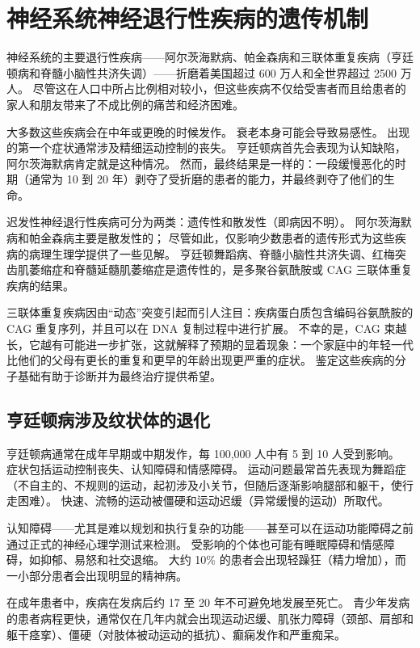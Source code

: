 \chapter{神经系统神经退行性疾病的遗传机制}

神经系统的主要退行性疾病——阿尔茨海默病、帕金森病和三联体重复疾病（亨廷顿病和脊髓小脑性共济失调）——折磨着美国超过 600 万人和全世界超过 2500 万人。 尽管这在人口中所占比例相对较小，但这些疾病不仅给受害者而且给患者的家人和朋友带来了不成比例的痛苦和经济困难。

大多数这些疾病会在中年或更晚的时候发作。 衰老本身可能会导致易感性。 出现的第一个症状通常涉及精细运动控制的丧失。 亨廷顿病首先会表现为认知缺陷，阿尔茨海默病肯定就是这种情况。 然而，最终结果是一样的：一段缓慢恶化的时期（通常为 10 到 20 年）剥夺了受折磨的患者的能力，并最终剥夺了他们的生命。

迟发性神经退行性疾病可分为两类：遗传性和散发性（即病因不明）。 阿尔茨海默病和帕金森病主要是散发性的； 尽管如此，仅影响少数患者的遗传形式为这些疾病的病理生理学提供了一些见解。 亨廷顿舞蹈病、脊髓小脑性共济失调、红梅突齿肌萎缩症和脊髓延髓肌萎缩症是遗传性的，是多聚谷氨酰胺或 CAG 三联体重复疾病的结果。

三联体重复疾病因由“动态”突变引起而引人注目：疾病蛋白质包含编码谷氨酰胺的 CAG 重复序列，并且可以在 DNA 复制过程中进行扩展。 不幸的是，CAG 束越长，它越有可能进一步扩张，这就解释了预期的显着现象：一个家庭中的年轻一代比他们的父母有更长的重复和更早的年龄出现更严重的症状。 鉴定这些疾病的分子基础有助于诊断并为最终治疗提供希望。

\section{亨廷顿病涉及纹状体的退化}
亨廷顿病通常在成年早期或中期发作，每 100,000 人中有 5 到 10 人受到影响。 症状包括运动控制丧失、认知障碍和情感障碍。 运动问题最常首先表现为舞蹈症（不自主的、不规则的运动，起初涉及小关节，但随后逐渐影响腿部和躯干，使行走困难）。 快速、流畅的运动被僵硬和运动迟缓（异常缓慢的运动）所取代。

认知障碍——尤其是难以规划和执行复杂的功能——甚至可以在运动功能障碍之前通过正式的神经心理学测试来检测。 受影响的个体也可能有睡眠障碍和情感障碍，如抑郁、易怒和社交退缩。 大约 10\% 的患者会出现轻躁狂（精力增加），而一小部分患者会出现明显的精神病。

在成年患者中，疾病在发病后约 17 至 20 年不可避免地发展至死亡。 青少年发病的患者病程更快，通常仅在几年内就会出现运动迟缓、肌张力障碍（颈部、肩部和躯干痉挛）、僵硬（对肢体被动运动的抵抗）、癫痫发作和严重痴呆。

